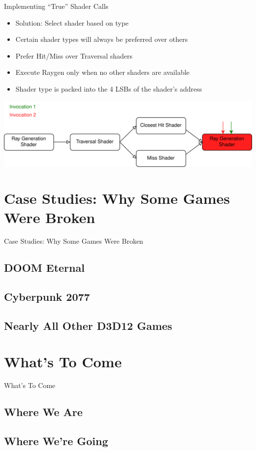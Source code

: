 \documentclass[aspectratio=169,t]{beamer}
\begin{document}
\begin{slide}{Implementing ``True'' Shader Calls}
 \begin{itemize}
  \item Solution: Select shader based on type
  \item Certain shader types will always be preferred over others
  \item Prefer Hit/Miss over Traversal shaders
  \item Execute Raygen only when no other shaders are available
  \item Shader type is packed into the 4 LSBs of the shader's address
 \end{itemize}
 \includegraphics[width=\textwidth]{graphics/RTStages2-8.png}
\end{slide}


\section{Case Studies: Why Some Games Were Broken}

\chapterIntroConfig
\begin{slide}{Case Studies: Why Some Games Were Broken}
\end{slide}

\subsection{DOOM Eternal}
\subsection{Cyberpunk 2077}
\subsection{Nearly All Other D3D12 Games}

\section{What's To Come}

\chapterIntroConfig
\begin{slide}{What's To Come}
\end{slide}

\subsection{Where We Are}
\subsection{Where We're Going}
\end{document}

